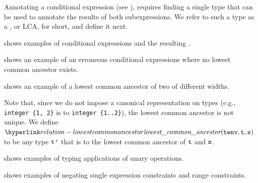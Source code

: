 
Annotating a conditional expression (see ),
requires finding a single type that can be used to annotate the results of both subexpressions.
We refer to such a type as a \emph{\Proselca}, or LCA, for short, and define it next.


 shows examples of conditional expressions and the resulting
\emph{\Proselca}.
\pagebreak
{}

 shows an example of an erroneous conditional expressions
where no lowest common ancestor exists.

 shows an example of a lowest common ancestor of two \bitvectortypesterm{}
of different widths.

Note that, since we do not impose a canonical representation on types
(e.g., \verb|integer {1, 2}| is \typeequivalentterm{} to \verb|integer {1..2}|),
the lowest common ancestor is not unique.
We define $\lca(\tenv, \vt, \vs)$ to be any type $\texttt{t'}$ that is \typeequivalentterm{} to the lowest common ancestor of $\texttt{t}$ and $\texttt{s}$.




 shows examples of typing applications of unary operations.




 shows examples of negating single expression
constraints and range constraints.


